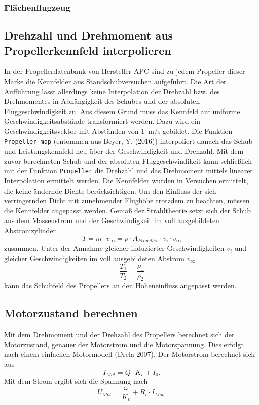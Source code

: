 \subsubsection{Flächenflugzeug}
\subsection{Drehzahl und Drehmoment aus Propellerkennfeld interpolieren}
In der Propellerdatenbank von Hersteller APC sind zu jedem Propeller dieser Marke die Kennfelder aus Standschubversuchen aufgeführt. Die Art der Aufführung lässt allerdings keine Interpolation der Drehzahl bzw. des Drehmomentes in Abhängigkeit des Schubes und der absoluten Fluggeschwindigkeit zu. Aus diesem Grund muss das Kennfeld auf uniforme Geschwindigkeitsabstände transformiert werden. Dazu wird ein Geschwindigkeitsvektor mit Abständen von \SI{1}{m/s} gebildet. Die Funktion \texttt{Propeller\_map} (entommen aus Beyer, Y. (2016)) interpoliert danach das Schub- und Leistungskennfeld neu über der Geschwindigkeit und Drehzahl. Mit dem zuvor berechneten Schub und der absoluten Fluggeschwindikeit kann schließlich mit der Funktion \texttt{Propeller} die Drehzahl und das Drehmoment mittels linearer Interpolation ermittelt werden.
Die Kennfelder wurden in Versuchen ermittelt, die keine ändernde Dichte berücksichtigen. Um den Einfluss der sich verringernden Dicht mit zunehmender Flughöhe trotzdem zu beachten, müssen die Kennfelder angepasst werden. Gemäß der Strahltheorie setzt sich der Schub aus dem Massenstrom und der Geschwindigkeit im voll ausgebildeten Abstromzylinder 
\begin{equation}
	T =  \dot{m}\cdot v_{\infty} = \rho\cdot A_{Propeller}\cdot v_i\cdot v_{\infty}
\end{equation}
zusammen. Unter der Annahme gleicher induzierter Geschwindigkeiten $v_i$ und gleicher Geschwindigkeiten im voll ausgebildeten Abstrom $v_{\infty}$
\begin{equation}
	\frac{T_1}{T_2} = \frac{\rho_1}{\rho_2}
\end{equation}
kann das Schubfeld des Propellers an den Höheneinfluss angepasst werden.

\subsection{Motorzustand berechnen}
Mit dem Drehmoment und der Drehzahl des Propellers berechnet sich der Motorzustand, genauer der Motorstrom und die Motorspannung. Dies erfolgt nach einem einfachen Motormodell (Drela 2007).
Der Motorstrom berechnet sich aus 
\begin{equation}
	I_{Mot} = Q\cdot K_v + I_0.
\end{equation}
Mit dem Strom ergibt sich die Spannung nach
\begin{equation}
	U_{Mot} = \frac{\omega}{K_v} + R_i\cdot I_{Mot}.
\end{equation}
